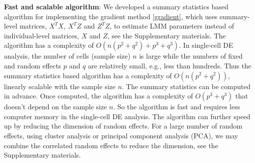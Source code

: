 \documentclass[
]{article}
\begin{document}
\textbf{Fast and scalable algorithm}: We developed a summary statistics
based algorithm for implementing the gradient method \eqref{gradient},
which uses summary-level matrices, \(X^TX\), \(X^TZ\) and \(Z^TZ\), to
estimate LMM parameters instead of individual-level matrices, \(X\) and
\(Z\), see the Supplementary materials. The algorithm has a complexity
of \(O(n(p^2 + q^2)+p^3+q^3)\). In single-cell DE analysis, the number
of cells (sample size) \(n\) is large while the numbers of fixed and
random effects \(p\) and \(q\) are relatively small, e.g., less than
hundreds. Thus the summary statistics based algorithm has a complexity
of \(O(n(p^2+q^2))\), linearly scalable with the sample size \(n\). The
summary statistics can be computed in advance. Once computed, the
algorithm has a complexity of \(O(p^3+q^3)\) that doesn't depend on the
sample size \(n\). So the algorithm is fast and requires less computer
memory in the single-cell DE analysis. The algorithm can further speed
up by reducing the dimension of random effects. For a large number of
random effects, using cluster analysis or principal component analysis
(PCA), we may combine the correlated random effects to reduce the
dimension, see the Supplementary materials.
\end{document}
